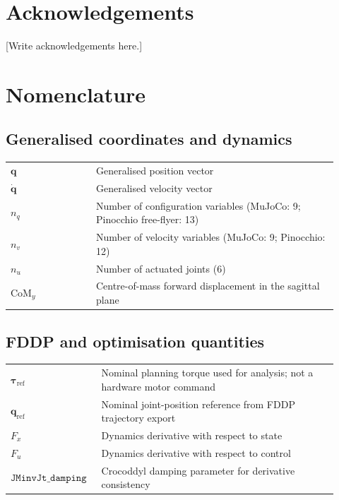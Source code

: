 \documentclass[12pt,a4paper]{report}
\begin{document}
\chapter*{Acknowledgements}
[Write acknowledgements here.]
 
\tableofcontents
\listoffigures
\listoftables
 
\chapter*{Nomenclature}
 
\section*{Generalised coordinates and dynamics}
\begin{tabular}{@{}>{\raggedright\arraybackslash}p{0.24\linewidth}>{\raggedright\arraybackslash}p{0.68\linewidth}@{}}
$\mathbf{q}$ & Generalised position vector \\
$\dot{\mathbf{q}}$ & Generalised velocity vector \\
$n_q$ & Number of configuration variables (MuJoCo: 9; Pinocchio free-flyer: 13) \\
$n_v$ & Number of velocity variables (MuJoCo: 9; Pinocchio: 12) \\
$n_u$ & Number of actuated joints (6) \\
$\mathrm{CoM}_y$ & Centre-of-mass forward displacement in the sagittal plane \\
\end{tabular}
 
\section*{FDDP and optimisation quantities}
\begin{tabular}{@{}>{\raggedright\arraybackslash}p{0.24\linewidth}>{\raggedright\arraybackslash}p{0.68\linewidth}@{}}
$\boldsymbol{\tau}_{\mathrm{ref}}$ & Nominal planning torque used for analysis; not a hardware motor command \\
$\mathbf{q}_{\mathrm{ref}}$ & Nominal joint-position reference from FDDP trajectory export \\
$F_x$ & Dynamics derivative with respect to state \\
$F_u$ & Dynamics derivative with respect to control \\
$\texttt{JMinvJt\_damping}$ & Crocoddyl damping parameter for derivative consistency \\
\end{tabular}
 
\end{document}
